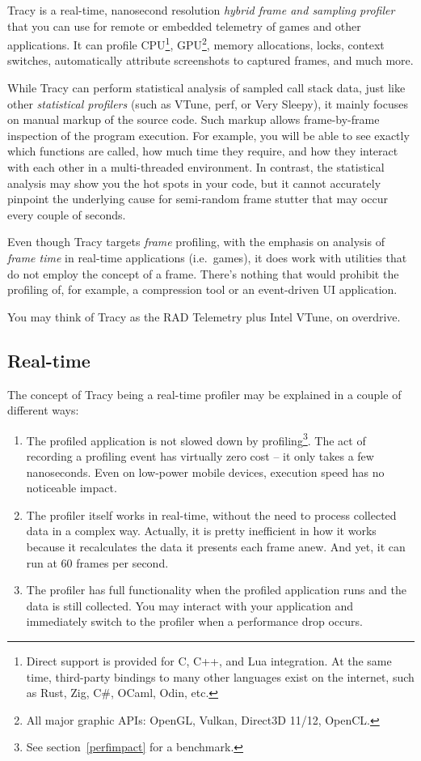 \documentclass[hidelinks,titlepage,a4paper,twoside]{article}
\begin{document}
Tracy is a real-time, nanosecond resolution \emph{hybrid frame and sampling profiler} that you can use for remote or embedded telemetry of games and other applications. It can profile CPU\footnote{Direct support is provided for C, C++, and Lua integration. At the same time, third-party bindings to many other languages exist on the internet, such as Rust, Zig, C\#, OCaml, Odin, etc.}, GPU\footnote{All major graphic APIs: OpenGL, Vulkan, Direct3D 11/12, OpenCL.}, memory allocations, locks, context switches, automatically attribute screenshots to captured frames, and much more.

While Tracy can perform statistical analysis of sampled call stack data, just like other \emph{statistical profilers} (such as VTune, perf, or Very Sleepy), it mainly focuses on manual markup of the source code. Such markup allows frame-by-frame inspection of the program execution. For example, you will be able to see exactly which functions are called, how much time they require, and how they interact with each other in a multi-threaded environment. In contrast, the statistical analysis may show you the hot spots in your code, but it cannot accurately pinpoint the underlying cause for semi-random frame stutter that may occur every couple of seconds.

Even though Tracy targets \emph{frame} profiling, with the emphasis on analysis of \emph{frame time} in real-time applications (i.e.~games), it does work with utilities that do not employ the concept of a frame. There's nothing that would prohibit the profiling of, for example, a compression tool or an event-driven UI application.

You may think of Tracy as the RAD Telemetry plus Intel VTune, on overdrive.

\subsection{Real-time}

The concept of Tracy being a real-time profiler may be explained in a couple of different ways:

\begin{enumerate}
\item The profiled application is not slowed down by profiling\footnote{See section~\ref{perfimpact} for a benchmark.}. The act of recording a profiling event has virtually zero cost -- it only takes a few nanoseconds. Even on low-power mobile devices, execution speed has no noticeable impact.
\item The profiler itself works in real-time, without the need to process collected data in a complex way. Actually, it is pretty inefficient in how it works because it recalculates the data it presents each frame anew. And yet, it can run at 60 frames per second.
\item The profiler has full functionality when the profiled application runs and the data is still collected. You may interact with your application and immediately switch to the profiler when a performance drop occurs.
\end{enumerate}
\end{document}
